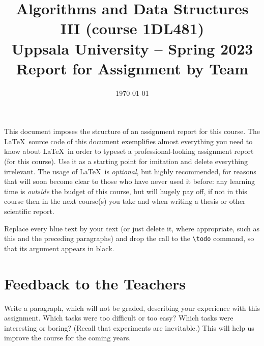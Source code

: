 \documentclass[a4paper,11pt,hidelinks]{article}
\title{\textbf{Algorithms and Data Structures III (course 1DL481) \\
    Uppsala University -- Spring 2023 \\
    Report for Assignment \todo{n}  %
    by Team \todo{t}}}              %
\author{\todo{Clara CLÄVER} \and \todo{Whiz KIDD}}
\date{\today}
\newcommand{\todo}[1]{{\color{blue}#1}}  %
\begin{document}
\maketitle

\todo{
  \noindent
  This document imposes the structure of an assignment report for this
  course.  The \LaTeX\ source code of this document exemplifies almost
  everything you need to know about \LaTeX\ in order to typeset a
  professional-looking assignment report (for this course).  Use it as
  a starting point for imitation and delete everything irrelevant.
  The usage of \LaTeX\ is \emph{optional}, but highly recommended, for
  reasons that will soon become clear to those who have never used it
  before: any learning time is \emph{outside} the budget of this
  course, but will hugely pay off, if not in this course then in the
  next course(s) you take and when writing a thesis or other
  scientific report. \medskip

  Replace every blue text by your text (or just delete it, where
  appropriate, such as this and the preceding paragraphs) and drop the
  call to the \texttt{\textbackslash{}todo} command, so that its
  argument appears in black.
  
}



\clearpage


\clearpage


\clearpage


\section*{Feedback to the Teachers}

\todo{Write a paragraph, which will not be graded, describing your
  experience with this assignment.  Which tasks were too difficult or
  too easy?  Which tasks were interesting or boring?  (Recall that
  experiments are inevitable.)  This will help us improve the course
  for the coming years.}



\todo{}
\end{document}
